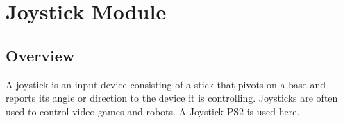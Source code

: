 \documentclass[a4paper,11pt,english]{sphinxmanual}
\begin{document}
\begin{enumerate}
\begin{sphinxVerbatim}[commandchars=\\\{\}]
\end{sphinxVerbatim}

\end{enumerate}

\sphinxstepscope


\section{Joystick Module}
\label{\detokenize{Basic_Project/Joystick_Module:joystick-module}}\label{\detokenize{Basic_Project/Joystick_Module:basic-joystick-module}}\label{\detokenize{Basic_Project/Joystick_Module::doc}}

\subsection{Overview}
\label{\detokenize{Basic_Project/Joystick_Module:overview}}
\sphinxAtStartPar
A joystick is an input device consisting of a stick that pivots on a base and reports its angle or direction to the device it is controlling. Joysticks are often used to control video games and robots. A Joystick PS2 is used here.
\end{document}

